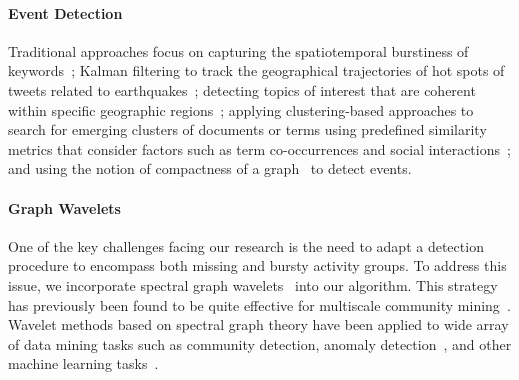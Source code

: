 \documentclass[twoside,leqno,twocolumn]{article}
\begin{document}
\paragraph{Event Detection}
Traditional approaches focus on capturing the spatiotemporal burstiness of keywords~\cite{lappas2009burstiness}; Kalman filtering to track the geographical trajectories of hot spots of tweets related to earthquakes~\cite{sakaki2010earthquake}; detecting topics of interest that are coherent within specific geographic regions~\cite{eisenstein2010latent,hong2012discovering,yin2011geographical}; applying clustering-based approaches to search for emerging clusters of documents or terms using predefined similarity metrics that consider factors such as term co-occurrences and social interactions~\cite{aggarwal2012event,sayyadi2009event,weng2011event}; and using the notion of compactness of a graph~\cite{rozenshtein2014event} to detect events.

\paragraph{Graph Wavelets}
One of the key challenges facing our research is the need to adapt a detection procedure to encompass both missing and bursty activity groups. To address this issue, we incorporate spectral graph wavelets~\cite{hammond2011wavelets} into our algorithm. This strategy has previously been found to be quite effective for multiscale community mining~\cite{tremblay2014graph}.
Wavelet methods based on spectral graph theory have been applied to wide array of data mining tasks such as community detection, anomaly detection~\cite{calderara2011detecting}, and other machine learning tasks~\cite{shuman_ACHA_2013,ghosh2003wavelet,rustamov2013wavelets,2000wavecluster,silva2016graph}. %
\end{document}

